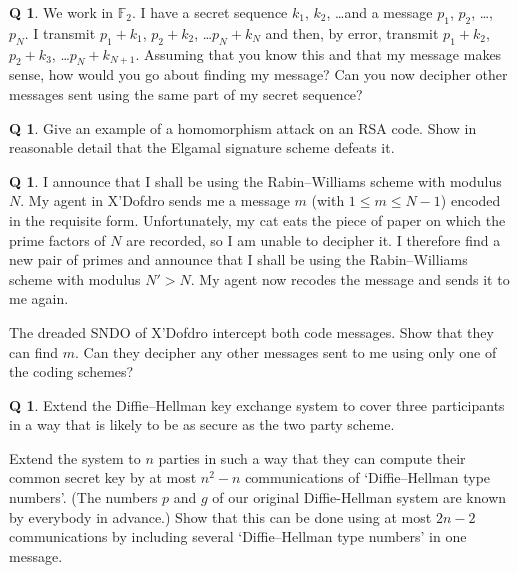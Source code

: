 \documentclass[12pt,a4paper]{article}
\theoremstyle{plain}
\theoremstyle{definition}
\newtheorem{question}[theorem]{Q}
\begin{document}
\begin{question}\label{C4.7}
We work in ${\mathbb F}_{2}$.
I have a secret sequence $k_{1}$, $k_{2}$, \dots  and a
message $p_{1}$, $p_{2}$, \dots, $p_{N}$. I transmit
$p_{1}+k_{1}$, $p_{2}+k_{2}$, \dots $p_{N}+k_{N}$
and then, by error, transmit
$p_{1}+k_{2}$, $p_{2}+k_{3}$, \dots $p_{N}+k_{N+1}$.
Assuming that you know this and that my
message makes sense, how would you go about
finding my message? Can you now decipher
other messages sent using the same
part of my secret sequence?
\end{question}
\begin{question}\label{C4.8}
Give an example of a homomorphism attack
on an RSA code. Show in reasonable
detail that the Elgamal
signature scheme defeats it.
\end{question}
\begin{question}\label{C4.9}
I announce that I shall
be using the Rabin--Williams scheme with
modulus $N$. My agent in X'Dofdro sends
me a message $m$ (with $1\leq m\leq N-1$)
encoded in the requisite form.
Unfortunately, my cat eats the piece of paper
on which the prime factors of $N$ are
recorded, so I am unable to decipher it.
I therefore find a new pair of primes
and announce that I shall
be using the Rabin--Williams scheme with
modulus $N'>N$. My agent now recodes
the message and sends it to me again.

The dreaded SNDO of X'Dofdro intercept
both code messages. Show that they
can find $m$. Can they decipher any
other messages sent to me using only
one of the coding schemes?
\end{question}
\begin{question}\label{C4.10}
Extend the Diffie--Hellman key exchange system
to cover three participants in a way that is
likely to be as secure as the two party scheme.

Extend the system to $n$ parties in such a way that
they can compute their common secret key by at 
most $n^{2}-n$ communications of `Diffie--Hellman type numbers'. 
(The numbers $p$
and $g$ of our original Diffie-Hellman system are
known by everybody in advance.) Show that this can be done using 
at most $2n-2$ communications by including several
`Diffie--Hellman type numbers' in one message.
\end{question}
 
\end{document}
